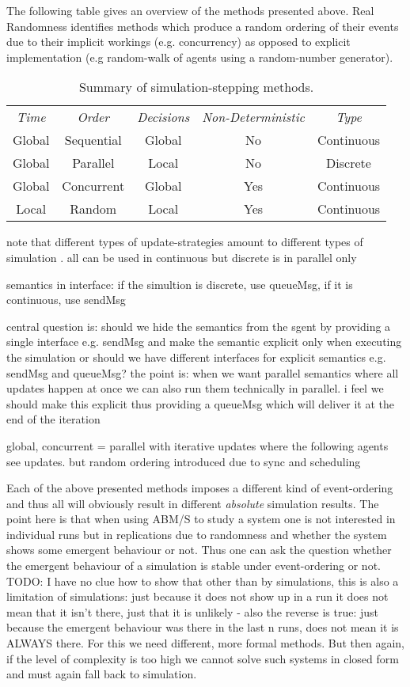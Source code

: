 \bigskip 

The following table gives an overview of the methods presented above. Real Randomness identifies methods which produce a random ordering of their events due to their implicit workings (e.g.  concurrency) as opposed to explicit implementation (e.g random-walk of agents using a random-number generator).

\begin{table}[H]
	\center
	\begin{tabular}{ c | c | c | c | c }
		\textit{Time} & \textit{Order} & \textit{Decisions} & \textit{Non-Deterministic} & \textit{Type}\\
		\hhline{=|=|=|=|=}
	    Global & Sequential & Global & No & Continuous \\ 
	    \hline
	    Global & Parallel & Local & No & Discrete \\ 
	    \hline
	    Global & Concurrent & Global & Yes & Continuous \\ 
	    \hline
	    Local & Random & Local & Yes & Continuous \\ 
	\end{tabular}
	\caption{Summary of simulation-stepping methods.}
\end{table}

note that different types of update-strategies amount to different types of simulation . all can be used in continuous but discrete is in parallel only

semantics in interface: if the simultion is discrete, use queueMsg, if it is continuous, use sendMsg

central question is: should we hide the semantics from the sgent by providing a single interface e.g. sendMsg and make the semantic explicit only when executing the simulation or should we have different interfaces for explicit semantics e.g. sendMsg and queueMsg? the point is: when we want parallel semantics where all updates happen at once we can also run them technically in parallel. i feel we should make this explicit thus providing a queueMsg which will deliver it at the end of the iteration

global, concurrent = parallel with iterative updates where the following agents see updates. but random ordering introduced due to sync and scheduling

Each of the above presented methods imposes a different kind of event-ordering and thus all will obviously result in different \textit{absolute} simulation results. The point here is that when using ABM/S to study a system one is not interested in individual runs but in replications due to randomness and whether the system shows some emergent behaviour or not. Thus one can ask the question whether the emergent behaviour of a simulation is stable under event-ordering or not. TODO: I have no clue how to show that other than by simulations, this is also a limitation of simulations: just because it does not show up in a run it does not mean that it isn't there, just that it is unlikely - also the reverse is true: just because the emergent behaviour was there in the last n runs, does not mean it is ALWAYS there. For this we need different, more formal methods. But then again, if the level of complexity is too high we cannot solve such systems in closed form and must again fall back to simulation.